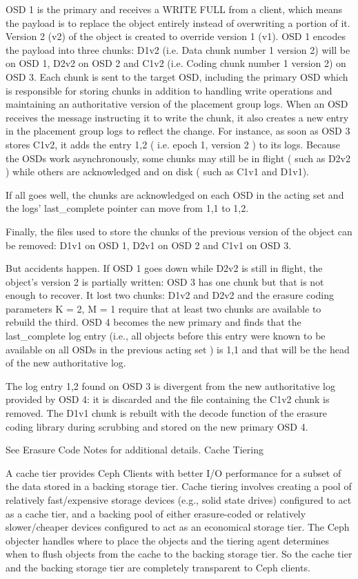 \documentclass[12pt,a4paper]{report}
\begin{document}
OSD 1 is the primary and receives a WRITE FULL from a client, which means the payload is to replace the object entirely instead of overwriting a portion of it. Version 2 (v2) of the object is created to override version 1 (v1). OSD 1 encodes the payload into three chunks: D1v2 (i.e. Data chunk number 1 version 2) will be on OSD 1, D2v2 on OSD 2 and C1v2 (i.e. Coding chunk number 1 version 2) on OSD 3. Each chunk is sent to the target OSD, including the primary OSD which is responsible for storing chunks in addition to handling write operations and maintaining an authoritative version of the placement group logs. When an OSD receives the message instructing it to write the chunk, it also creates a new entry in the placement group logs to reflect the change. For instance, as soon as OSD 3 stores C1v2, it adds the entry 1,2 ( i.e. epoch 1, version 2 ) to its logs. Because the OSDs work asynchronously, some chunks may still be in flight ( such as D2v2 ) while others are acknowledged and on disk ( such as C1v1 and D1v1).

If all goes well, the chunks are acknowledged on each OSD in the acting set and the logs’ last_complete pointer can move from 1,1 to 1,2.

Finally, the files used to store the chunks of the previous version of the object can be removed: D1v1 on OSD 1, D2v1 on OSD 2 and C1v1 on OSD 3.

But accidents happen. If OSD 1 goes down while D2v2 is still in flight, the object’s version 2 is partially written: OSD 3 has one chunk but that is not enough to recover. It lost two chunks: D1v2 and D2v2 and the erasure coding parameters K = 2, M = 1 require that at least two chunks are available to rebuild the third. OSD 4 becomes the new primary and finds that the last_complete log entry (i.e., all objects before this entry were known to be available on all OSDs in the previous acting set ) is 1,1 and that will be the head of the new authoritative log.

The log entry 1,2 found on OSD 3 is divergent from the new authoritative log provided by OSD 4: it is discarded and the file containing the C1v2 chunk is removed. The D1v1 chunk is rebuilt with the decode function of the erasure coding library during scrubbing and stored on the new primary OSD 4.

See Erasure Code Notes for additional details.
Cache Tiering

A cache tier provides Ceph Clients with better I/O performance for a subset of the data stored in a backing storage tier. Cache tiering involves creating a pool of relatively fast/expensive storage devices (e.g., solid state drives) configured to act as a cache tier, and a backing pool of either erasure-coded or relatively slower/cheaper devices configured to act as an economical storage tier. The Ceph objecter handles where to place the objects and the tiering agent determines when to flush objects from the cache to the backing storage tier. So the cache tier and the backing storage tier are completely transparent to Ceph clients.
\end{document}
